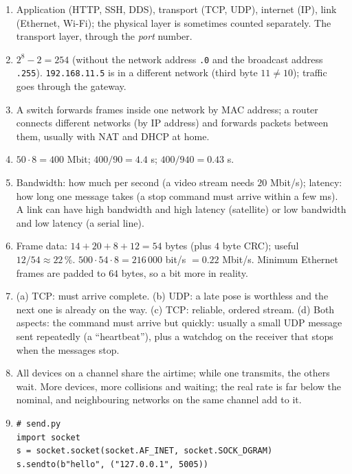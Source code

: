 \begin{enumerate}[label=\textbf{\ansnum.\arabic*}]
  \item Application (HTTP, SSH, DDS), transport (TCP, UDP), internet (IP), link (Ethernet, Wi-Fi); the physical layer is sometimes counted separately. The transport layer, through the \emph{port} number.
  \item $2^8-2=254$ (without the network address \texttt{.0} and the broadcast address \texttt{.255}). \texttt{192.168.11.5} is in a different network (third byte $11\neq10$); traffic goes through the gateway.
  \item A switch forwards frames inside one network by MAC address; a router connects different networks (by IP address) and forwards packets between them, usually with NAT and DHCP at home.
  \item $50\cdot8=400$ Mbit; $400/90=4.4$ s; $400/940=0.43$ s.
  \item Bandwidth: how much per second (a video stream needs $20$ Mbit/s); latency: how long one message takes (a stop command must arrive within a few ms). A link can have high bandwidth and high latency (satellite) or low bandwidth and low latency (a serial line).
  \item Frame data: $14+20+8+12=54$ bytes (plus $4$ byte CRC); useful $12/54\approx22\,\%$. $500\cdot54\cdot8=216\,000$ bit/s $=0.22$ Mbit/s. Minimum Ethernet frames are padded to $64$ bytes, so a bit more in reality.
  \item (a) TCP: must arrive complete. (b) UDP: a late pose is worthless and the next one is already on the way. (c) TCP: reliable, ordered stream. (d) Both aspects: the command must arrive but quickly: usually a small UDP message sent repeatedly (a ``heartbeat''), plus a watchdog on the receiver that stops when the messages stop.
  \item All devices on a channel share the airtime; while one transmits, the others wait. More devices, more collisions and waiting; the real rate is far below the nominal, and neighbouring networks on the same channel add to it.
  \item
\begin{verbatim}
# send.py
import socket
s = socket.socket(socket.AF_INET, socket.SOCK_DGRAM)
s.sendto(b"hello", ("127.0.0.1", 5005))


\end{verbatim}
\end{enumerate}
